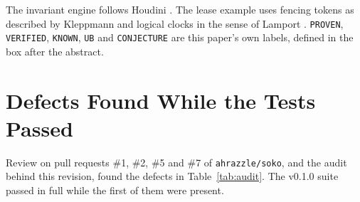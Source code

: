 \documentclass[11pt,a4paper]{article}
\begin{document}
The invariant engine follows Houdini \cite{flanagan2001houdini}. The lease example uses fencing tokens as described by Kleppmann \cite{kleppmann2016fencing} and logical clocks in the sense of Lamport \cite{lamport1978time}. \texttt{PROVEN}, \texttt{VERIFIED}, \texttt{KNOWN}, \texttt{UB} and \texttt{CONJECTURE} are this paper's own labels, defined in the box after the abstract.

\section{Defects Found While the Tests Passed}

Review on pull requests \#1, \#2, \#5 and \#7 of \texttt{ahrazzle/soko}, and the audit behind this revision, found the defects in Table~\ref{tab:audit}. The v0.1.0 suite passed in full while the first of them were present.
\end{document}
